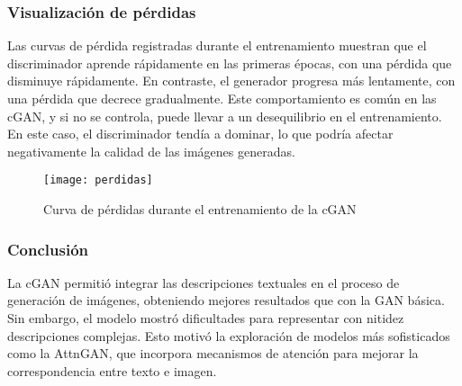 \subsubsection{Visualización de pérdidas}
Las curvas de pérdida registradas durante el entrenamiento muestran que el discriminador aprende rápidamente en las primeras épocas, con una pérdida que disminuye rápidamente. En contraste, el generador progresa más lentamente, con una pérdida que decrece gradualmente. Este comportamiento es común en las cGAN, y si no se controla, puede llevar a un desequilibrio en el entrenamiento. En este caso, el discriminador tendía a dominar, lo que podría afectar negativamente la calidad de las imágenes generadas.

\begin{figure}[H]
\centering
\texttt{[image: perdidas]}
\caption{Curva de pérdidas durante el entrenamiento de la cGAN}
\label{fig:loss_curve_cgan}
\end{figure}

\subsubsection{Conclusión}
La cGAN permitió integrar las descripciones textuales en el proceso de generación de imágenes, obteniendo mejores resultados que con la GAN básica. Sin embargo, el modelo mostró dificultades para representar con nitidez descripciones complejas. Esto motivó la exploración de modelos más sofisticados como la AttnGAN, que incorpora mecanismos de atención para mejorar la correspondencia entre texto e imagen.
